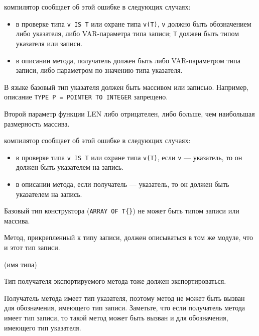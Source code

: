 \ot{} компилятор сообщает об этой ошибке в следующих случаях:
\begin{itemize}
\item в проверке типа \verb'v IS T' или охране типа \verb'v(T)', \verb'v'
 должно быть обозначением либо указателя, либо VAR-параметра типа записи;
 \verb'T' должен быть типом указателя или записи.
\item в описании метода, получатель должен быть либо VAR-параметром типа
 записи, либо параметром по значению типа указателя.
\end{itemize}


В языке \ot{} базовый тип указателя должен быть массивом или записью.
Например, описание \verb'TYPE P = POINTER TO INTEGER' запрещено.


Второй параметр функции LEN либо отрицателен, либо больше, чем 
наибольшая размерность массива.


\ot{} компилятор сообщает об этой ошибке в следующих случаях:
\begin{itemize}
\item в проверке типа \verb'v IS T' или охране типа \verb'v(T)', 
 если \verb'v' --- указатель, то он должен быть указателем на запись.
\item в описании метода, если получатель --- указатель, то он 
должен быть указателем на запись.
\end{itemize}


Базовый тип конструктора (\verb'ARRAY OF T{}') не может быть типом
записи или массива.


Метод, прикрепленный к типу записи, должен описываться в том же модуле,
что и этот тип записи.

(имя типа)

Тип получателя экспортируемого метода тоже должен экспортироваться.


Получатель метода имеет тип указателя, поэтому метод не может быть
вызван для обозначения, имеющего тип записи. Заметьте, что если
получатель метода имеет тип записи, то такой метод может быть вызван 
и для обозначения, имеющего тип указателя.

